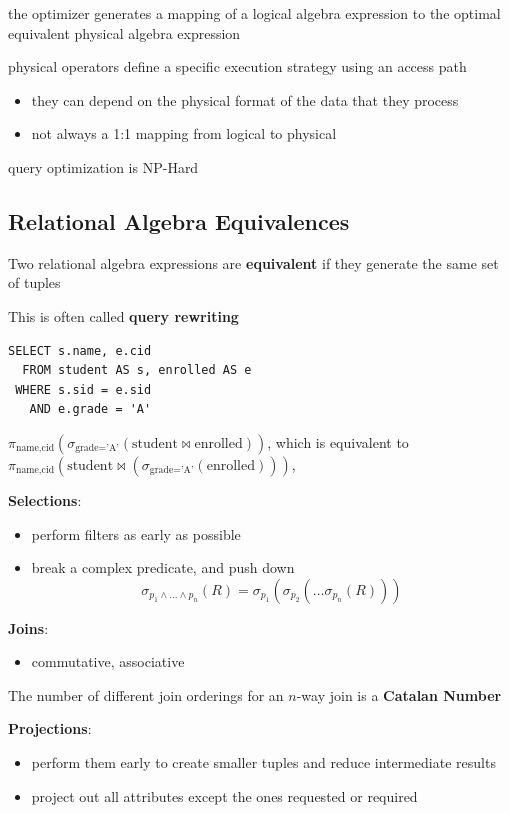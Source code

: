 \documentclass[11pt]{article}
\begin{document}
the optimizer generates a mapping of a logical algebra expression to the optimal equivalent
physical algebra expression

physical operators define a specific execution strategy using an access path
\begin{itemize}
\item they can depend on the physical format of the data that they process
\item not always a 1:1 mapping from logical to physical
\end{itemize}

query optimization is NP-Hard
\subsection{Relational Algebra Equivalences}
\label{sec:org1bf1468}
Two relational algebra expressions are \textbf{equivalent} if they generate the same set of tuples

This is often called \textbf{query rewriting}

\begin{verbatim}
SELECT s.name, e.cid
  FROM student AS s, enrolled AS e
 WHERE s.sid = e.sid
   AND e.grade = 'A'
\end{verbatim}
\(\pi_{\text{name},\text{cid}}(\sigma_{\text{grade='A'}}(\text{student}\bowtie\text{enrolled}))\),
which is equivalent to
\(\pi_{\text{name},\text{cid}}(\text{student}\bowtie(\sigma_{\text{grade='A'}}(\text{enrolled})))\),

\textbf{Selections}:
\begin{itemize}
\item perform filters as early as possible
\item break a complex predicate, and push down
\begin{equation*}
\sigma_{p_1\wedge\dots\wedge p_n}(R)=\sigma_{p_1}(\sigma_{p_2}(\dots\sigma_{p_n}(R)))
\end{equation*}
\end{itemize}

\textbf{Joins}:
\begin{itemize}
\item commutative, associative
\end{itemize}

The number of different join orderings for an \(n\)-way join is a \textbf{Catalan Number}

\textbf{Projections}:
\begin{itemize}
\item perform them early to create smaller tuples and reduce intermediate results
\item project out all attributes except the ones requested or required
\end{itemize}
\end{document}
